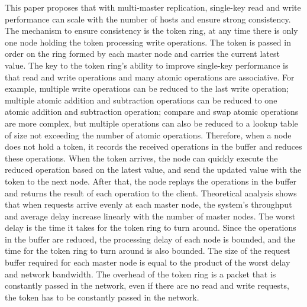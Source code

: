 This paper proposes that with multi-master replication, single-key read and write performance can scale with the number of hosts and ensure strong consistency. The mechanism to ensure consistency is the token ring, at any time there is only one node holding the token processing write operations. The token is passed in order on the ring formed by each master node and carries the current latest value. The key to the token ring's ability to improve single-key performance is that read and write operations and many atomic operations are associative. For example, multiple write operations can be reduced to the last write operation; multiple atomic addition and subtraction operations can be reduced to one atomic addition and subtraction operation; compare and swap atomic operations are more complex, but multiple operations can also be reduced to a lookup table of size not exceeding the number of atomic operations. Therefore, when a node does not hold a token, it records the received operations in the buffer and reduces these operations. When the token arrives, the node can quickly execute the reduced operation based on the latest value, and send the updated value with the token to the next node. After that, the node replays the operations in the buffer and returns the result of each operation to the client. Theoretical analysis shows that when requests arrive evenly at each master node, the system's throughput and average delay increase linearly with the number of master nodes. The worst delay is the time it takes for the token ring to turn around. Since the operations in the buffer are reduced, the processing delay of each node is bounded, and the time for the token ring to turn around is also bounded. The size of the request buffer required for each master node is equal to the product of the worst delay and network bandwidth. The overhead of the token ring is a packet that is constantly passed in the network, even if there are no read and write requests, the token has to be constantly passed in the network.

